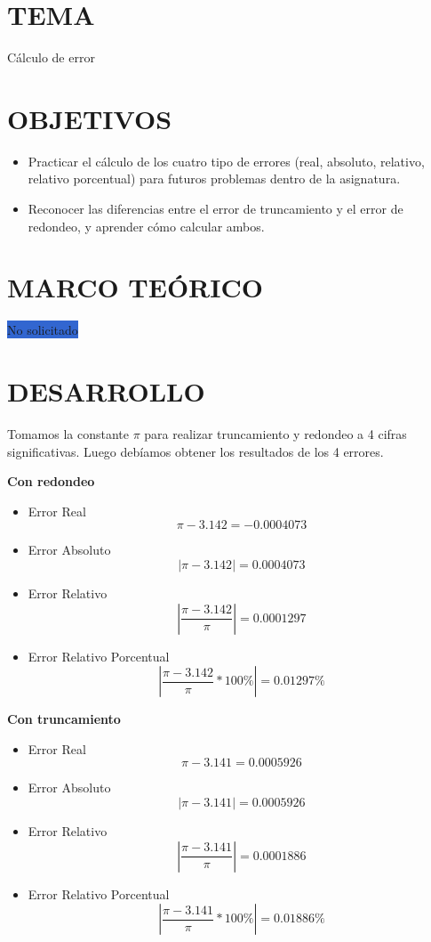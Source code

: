 \documentclass[12pt]{article}
\begin{document}
\section*{TEMA}
Cálculo de error

\vspace{0.5cm}

\section*{OBJETIVOS}
\begin{itemize}
    \item Practicar el cálculo de los cuatro tipo de errores (real, absoluto, relativo, relativo porcentual) para futuros problemas dentro de la asignatura.
    \item Reconocer las diferencias entre el error de truncamiento y el error de redondeo, y aprender cómo calcular ambos.
\end{itemize}

\vspace{0.5cm}

\section*{MARCO TEÓRICO}
\colorbox{highlight}{No solicitado} 

\vspace{0.5cm}

\section*{DESARROLLO}
Tomamos la constante $\pi$  para realizar truncamiento y redondeo a 4 cifras significativas. Luego debíamos obtener los resultados de los 4 errores.

\large\textbf{Con redondeo}
\begin{itemize}
\item Error Real
$$\pi - 3.142 = -0.0004073$$
\item Error Absoluto
$$
\left| \pi - 3.142 \right| = 0.0004073
$$
\item Error Relativo
$$
\left| \frac{\pi - 3.142}{\pi} \right| = 0.0001297
$$
\item Error Relativo Porcentual
$$
\left| \frac{\pi - 3.142}{\pi} *100\% \right| = 0.01297\%
$$ 
\end{itemize}
\large\textbf{Con truncamiento}
\begin{itemize}
    \item Error Real
    $$\pi - 3.141 = 0.0005926$$
    \item Error Absoluto
    $$
    \left| \pi - 3.141 \right| = 0.0005926
    $$
    \item Error Relativo
    $$
    \left| \frac{\pi - 3.141}{\pi} \right| = 0.0001886
    $$
    \item Error Relativo Porcentual
    $$
    \left| \frac{\pi - 3.141}{\pi} *100\% \right| = 0.01886\%
    $$ 
    \end{itemize}
\vspace{0.5cm}


\renewcommand{\refname}{\MakeUppercase{REFERENCIAS}}
%
%
\end{document}
